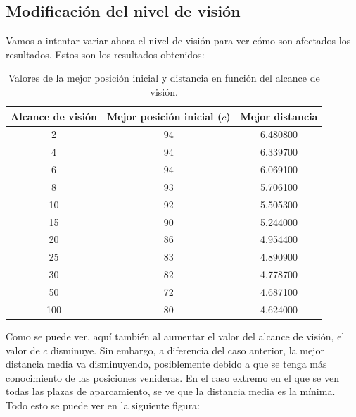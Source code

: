 \documentclass[11pt,a4paper]{report}
\begin{document}
\subsection{Modificación del nivel de visión}

Vamos a intentar variar ahora el nivel de visión para ver cómo son afectados los resultados. Estos son los resultados
obtenidos:

\begin{table}[H]
\begin{tabular}{c|c|c}
\textbf{Alcance de visión} & \textbf{Mejor posición inicial ($c$)} & \textbf{Mejor distancia} \\ \hline
2                          & 94                              & 6.480800                 \\
4                          & 94                              & 6.339700                 \\
6                          & 94                              & 6.069100                 \\
8                          & 93                              & 5.706100                 \\
10                         & 92                              & 5.505300                 \\
15                         & 90                              & 5.244000                 \\
20                         & 86                              & 4.954400                 \\
25                         & 83                              & 4.890900                 \\
30                         & 82                              & 4.778700                 \\
50                         & 72                              & 4.687100                 \\
100                        & 80                              & 4.624000                
\end{tabular}
\caption{Valores de la mejor posición inicial y distancia en función del alcance de visión.}
\label{aparc-tabla-vis}
\end{table}

Como se puede ver, aquí también al aumentar el valor del alcance de visión, el valor de $c$ disminuye. Sin embargo,
a diferencia del caso anterior, la mejor distancia media va disminuyendo, posiblemente debido a que se tenga más
conocimiento de las posiciones venideras. En el caso extremo en el que se ven todas las plazas de aparcamiento,
se ve que la distancia media es la mínima. Todo esto se puede ver en la siguiente figura:
\end{document}
